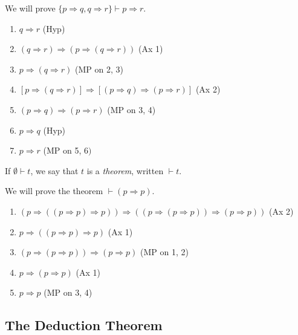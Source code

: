 \documentclass[a3paper, 10pt]{article}
\renewcommand{\vocab}[1]{\emph{#1}}
\begin{document}
\begin{multicols*}{5}
\begin{example}
  We will prove $\{p\Rightarrow q, q \Rightarrow r\} \vdash p \Rightarrow r$.

  \begin{enumerate}
    \item $q \Rightarrow r$ \hfill (Hyp)
    \item $(q \Rightarrow r) \Rightarrow(p \Rightarrow(q \Rightarrow r))$ \hfill (Ax 1)
    \item $p \Rightarrow(q \Rightarrow r)$ \hfill (MP on 2, 3)
    \item $[p \Rightarrow(q \Rightarrow r)] \Rightarrow[(p \Rightarrow q) \Rightarrow(p \Rightarrow r)]$ \hfill (Ax 2)
    \item $(p \Rightarrow q) \Rightarrow(p \Rightarrow r)$ \hfill (MP on 3, 4)
    \item $p \Rightarrow q$ \hfill (Hyp)
    \item $p \Rightarrow r$ \hfill (MP on 5, 6$)$
  \end{enumerate}
\end{example}

\begin{definition}[Theorem]
  If $\emptyset \vdash t$, we say that $t$ is a \vocab{theorem}, written $\vdash t$.
\end{definition}

\begin{example}
  We will prove the theorem $\vdash (p \Rightarrow p)$.

  \begin{enumerate}
    \item $(p \Rightarrow((p \Rightarrow p) \Rightarrow p)) \Rightarrow((p \Rightarrow(p \Rightarrow p)) \Rightarrow(p \Rightarrow p))$ \hfill(Ax 2)
    \item $p \Rightarrow((p \Rightarrow p) \Rightarrow p)$ \hfill(Ax 1)
    \item $(p \Rightarrow(p \Rightarrow p)) \Rightarrow(p \Rightarrow p)$ \hfill(MP on 1, 2)
    \item $p \Rightarrow(p \Rightarrow p)$ \hfill(Ax 1)
    \item $p \Rightarrow p$ \hfill(MP on 3, 4)
  \end{enumerate}
\end{example}

\subsection{The Deduction Theorem}


\end{multicols*}
\end{document}

